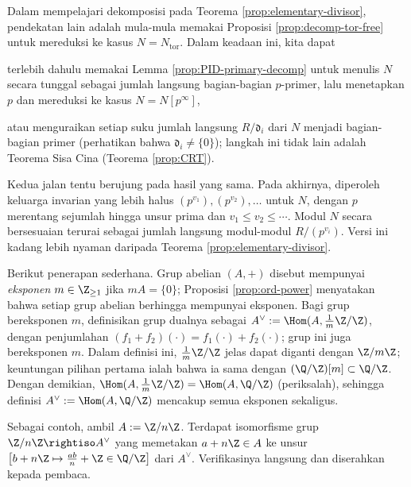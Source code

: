 \begin{remark}\label{rem:primary-elementary-divisor}
	Dalam mempelajari dekomposisi pada Teorema \ref{prop:elementary-divisor}, pendekatan lain adalah mula-mula memakai Proposisi \ref{prop:decomp-tor-free} untuk mereduksi ke kasus $N = N_\text{tor}$. Dalam keadaan ini, kita dapat
	\begin{inparaenum}[(a)]
		\item terlebih dahulu memakai Lemma \ref{prop:PID-primary-decomp} untuk menulis $N$ secara tunggal sebagai jumlah langsung bagian-bagian $p$-primer, lalu menetapkan $p$ dan mereduksi ke kasus $N = N[p^\infty]$,
		\item atau menguraikan setiap suku jumlah langsung $R/\mathfrak{d}_i$ dari $N$ menjadi bagian-bagian primer (perhatikan bahwa $\mathfrak{d}_i \neq \{0\}$); langkah ini tidak lain adalah Teorema Sisa Cina (Teorema \ref{prop:CRT}).
	\end{inparaenum}
	Kedua jalan tentu berujung pada hasil yang sama. Pada akhirnya, diperoleh keluarga invarian yang lebih halus $(p^{v_1}), (p^{v_2}), \ldots$ untuk $N$, dengan $p$ merentang sejumlah hingga unsur prima dan $v_1 \leq v_2 \leq \cdots$. Modul $N$ secara bersesuaian terurai sebagai jumlah langsung modul-modul $R/(p^{v_i})$. Versi ini kadang lebih nyaman daripada Teorema \ref{prop:elementary-divisor}.
\end{remark}

Berikut penerapan sederhana. Grup abelian $(A,+)$ disebut mempunyai \emph{eksponen} $m \in \Z_{\geq 1}$ jika $mA=\{0\}$; Proposisi \ref{prop:ord-power} menyatakan bahwa setiap grup abelian berhingga mempunyai eksponen. Bagi grup bereksponen $m$, definisikan grup dualnya sebagai $A^\vee := \Hom(A, \frac{1}{m}\Z/\Z)$, dengan penjumlahan $(f_1 + f_2)(\cdot) = f_1(\cdot) + f_2(\cdot)$; grup ini juga bereksponen $m$. Dalam definisi ini, $\frac{1}{m}\Z/\Z$ jelas dapat diganti dengan $\Z/m\Z$; keuntungan pilihan pertama ialah bahwa ia sama dengan $(\Q/\Z)[m] \subset \Q/\Z$. Dengan demikian, $\Hom(A, \frac{1}{m}\Z/\Z) = \Hom(A, \Q/\Z)$ (periksalah), sehingga definisi $A^\vee := \Hom(A, \Q/\Z)$ mencakup semua eksponen sekaligus. 

Sebagai contoh, ambil $A := \Z/n\Z$. Terdapat isomorfisme grup $\Z/n\Z \rightiso A^\vee$ yang memetakan $a + n\Z \in A$ ke unsur $\left[ b+n\Z \mapsto \frac{ab}{n} + \Z \in \Q/\Z \right]$ dari $A^\vee$. Verifikasinya langsung dan diserahkan kepada pembaca.

